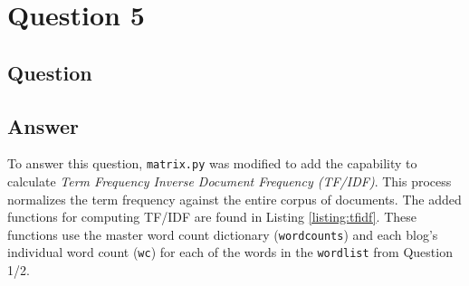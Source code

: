 \section{Question 5}

\subsection{Question}


\subsection{Answer}

To answer this question, {\tt matrix.py} was modified to add the capability to calculate {\it Term Frequency Inverse Document Frequency (TF/IDF)}. This process normalizes the term frequency against the entire corpus of documents. The added functions for computing TF/IDF are found in Listing \ref{listing:tfidf}. These functions use the master word count dictionary ({\tt wordcounts}) and each blog's individual word count ({\tt wc}) for each of the words in the {\tt wordlist} from Question 1/2.





